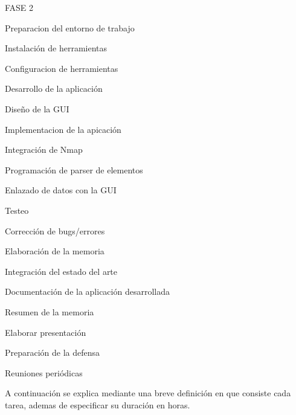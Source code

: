 \begin{numbered}
	\item FASE 2
	\begin{numbered}
		\item Preparacion del entorno de trabajo
		\begin{numbered}
			\item Instalación de herramientas
			\item Configuracion de herramientas
		\end{numbered}
		
		\item Desarrollo de la aplicación
		\begin{numbered}
			\item Diseño de la GUI
			\item Implementacion de la apicación
			\begin{numbered}
				\item Integración de Nmap
				\item Programación de parser de elementos
				\item Enlazado de datos con la GUI
			\end{numbered}
			\item Testeo
			\item Corrección de bugs/errores
		\end{numbered}
	\end{numbered}
	
	\item Elaboración de la memoria
	\begin{numbered}
		\item Integración del estado del arte
		\item Documentación de la aplicación desarrollada
		\item Resumen de la memoria
		\item Elaborar presentación
		\item Preparación de la defensa
	\end{numbered}
	
	\item Reuniones periódicas
\end{numbered}

A continuación se explica mediante una breve definición en que consiste cada tarea, ademas de especificar su duración en horas.

